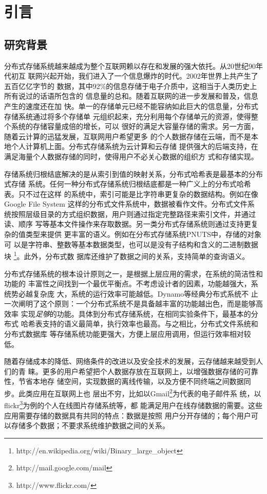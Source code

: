 \chapter{引言}
\label{cha:intro}

\section{研究背景}
分布式存储系统越来越成为整个互联网赖以存在和发展的强大依托。从20世纪90年代初互
联网兴起开始，我们进入了一个信息爆炸的时代。2002年世界上共产生了五百亿亿字节的
数据，其中92\%的信息存储于电子介质中，这相当于人类历史上所有说过的话语所包含的
信息量的总和。\cite{Ma2006}随着互联网的进一步发展和普及，信息产生的速度还在加
快。单一的存储单元已经不能容纳如此巨大的信息量，分布式存储系统通过将多个存储单
元组织起来，充分利用每个存储单元的资源，使得整个系统的存储容量成倍的增长，可以
很好的满足大容量存储的需求。另一方面，随着云计算的迅猛发展，互联网用户希望更多
的个人数据存储在云端，而不是本地个人计算机上面。分布式存储系统为云计算和云存储
提供强大的后端支持，在满足海量个人数据存储的同时，使得用户不必关心数据的组织方
式和存储实现。

存储系统归根结底解决的是从索引到值的映射关系，分布式哈希表是最基本的分布式存储
系统。任何一种分布式存储系统归根结底都是一种广义上的分布式哈希表。只不过在这样
的系统中，索引可能是比字符串更复杂的数据结构。例如在像Google File System
\cite{ghemawat2003google}这样的分布式文件系统中，数据被看作文件。分布式文件系
统按照层级目录的方式组织数据，用户则通过指定完整路径来索引文件，并通过读、顺序
写等基本文件操作来存取数据。另一类分布式存储系统则通过支持更复杂的值类型来提供
更丰富的语义。例如在分布式存储系统PNUTS\cite{cooper2008pnuts}中，存储的对象可
以是字符串、整数等基本数据类型，也可以是没有子结构和含义的二进制数据块
\footnote{http://en.wikipedia.org/wiki/Binary\_large\_object}。此外，分布式数
据库还维护了数据之间的关系，支持简单的查询语义。

分布式存储系统的根本设计原则之一，是根据上层应用的需求，在系统的简洁性和功能的
丰富性之间找到一个最优平衡点。不考虑设计者的因素，功能越强大，系统势必越复杂庞
大，系统的运行效率可能越低。Dynamo\cite{hastorun2007dynamo}等经典分布式系统不
止一次阐明了这个原则：一个分布式系统不是具备越丰富的功能越出色，而是能够高效率
实现\emph{足够}的功能。具体到分布式存储系统，在相同实验条件下，最基本的分布式
哈希表支持的语义最简单，执行效率也最高。与之相比，分布式文件系统和分布式数据库
等存储系统功能更强大，方便上层应用调用，但运行效率相对较低。

随着存储成本的降低、网络条件的改进以及安全技术的发展，云存储越来越受到人们的青
睐。更多的用户希望把个人数据存放在互联网上，以增强数据存储的可靠性，节省本地存
储空间，实现数据的离线传输，以及方便不同终端之间数据同步。此类应用在互联网上也
层出不穷，比如以Gmail\footnote{http://mail.google.com/mail}为代表的电子邮件系
统，以flickr\footnote{http://www.flickr.com/}为例的个人在线图片存储系统等，都
能满足用户在线存储数据的需要。这些应用需要存储的数据具有共同的特点：数据是按照
用户分开存储的；每个用户可以存储多个数据；不要求系统维护数据之间的关系。

